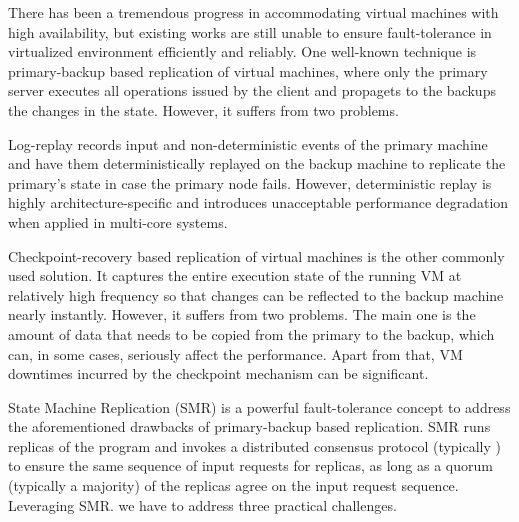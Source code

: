 There has been a tremendous progress in accommodating virtual machines with high availability, 
but existing works are still unable to ensure fault-tolerance in virtualized environment efficiently and reliably. 
One well-known technique is primary-backup based replication of virtual machines, where only the primary 
server executes all operations issued by the client and propagets to the backups the changes in the state. However, 
it suffers from two problems.



Log-replay records input and non-deterministic events of the primary machine and have them 
deterministically replayed on the backup machine to replicate the primary's state in case 
the primary node fails. However, deterministic replay is highly architecture-specific and 
introduces unacceptable performance degradation when applied in multi-core systems.

Checkpoint-recovery based replication of virtual machines is the other commonly used solution. 
It captures the entire execution state of the running VM at relatively high frequency so that 
changes can be reflected to the backup machine nearly instantly. However, it suffers from two 
problems. The main one is the amount of data that needs to be copied from the primary to the 
backup, which can, in some cases, seriously affect the performance. Apart from that, VM 
downtimes incurred by the checkpoint mechanism can be significant.

State Machine Replication (SMR) is a powerful fault-tolerance concept to address the aforementioned 
drawbacks of primary-backup based replication. SMR runs replicas of the program and invokes a 
distributed consensus protocol (typically \paxos) to ensure the same sequence of input requests 
for replicas, as long as a quorum (typically a majority) of the replicas agree on the input 
request sequence. Leveraging SMR. we have to address three practical challenges. 

